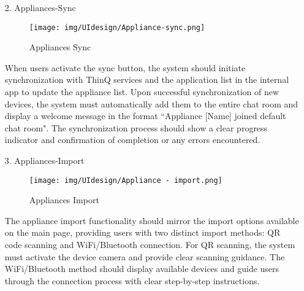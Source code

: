 \documentclass[conference]{IEEEtran}
\begin{document}
\begin{enumerate}
\begin{itemize}
\begin{itemize}
\begin{enumerate}
\begin{enumerate}
    \item[2.] Appliances-Sync
    \begin{figure}[h]
        {\centering
        \hspace{4cm}
        \begin{minipage}{0.2\columnwidth}
            \texttt{[image: img/UIdesign/Appliance-sync.png]}
            \captionsetup{width=2.5\linewidth}
            \caption{Appliances Sync}
        \end{minipage}}
    \end{figure}

    When users activate the sync button, the system should initiate synchronization with ThinQ services and the application list in the internal app to update the appliance list. Upon successful synchronization of new devices, the system must automatically add them to the entire chat room and display a welcome message in the format ``Appliance [Name] joined default chat room". The synchronization process should show a clear progress indicator and confirmation of completion or any errors encountered. \\
\end{enumerate}

\begin{enumerate}
    \item[3.] Appliances-Import
    \begin{figure}[h]
        {\centering
        \hspace{4cm}
        \begin{minipage}{0.2\columnwidth}
            \texttt{[image: img/UIdesign/Appliance - import.png]}
            \captionsetup{width=2.5\linewidth}
        \caption{Appliances Import} %
        \end{minipage}}
    \end{figure}

    The appliance import functionality should mirror the import options available on the main page, providing users with two distinct import methods: QR code scanning and WiFi/Bluetooth connection. For QR scanning, the system must activate the device camera and provide clear scanning guidance. The WiFi/Bluetooth method should display available devices and guide users through the connection process with clear step-by-step instructions. \\ 
\end{enumerate}


\end{enumerate}
\end{itemize}
\end{itemize}
\end{enumerate}
\end{document}
